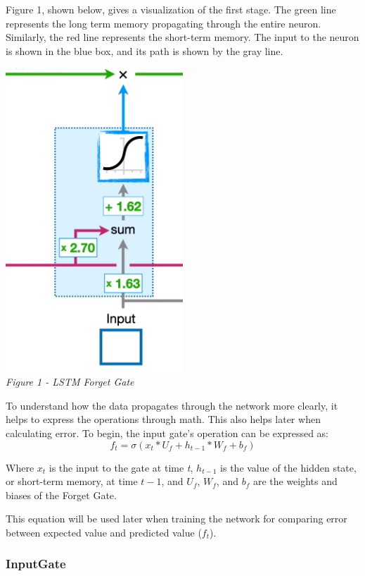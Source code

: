 \documentclass[12pt]{article}
\begin{document}
Figure 1, shown below, gives a visualization of the first stage. The green line
represents the long term memory propagating through the entire neuron.
Similarly, the red line represents the short-term memory. The input to the
neuron is shown in the blue box, and its path is shown by the gray line.

\begin{center}
    \includegraphics[width=0.5\textwidth]{ForgetGate.png}\\
    \emph{Figure 1 - LSTM Forget Gate}
\end{center}
To understand how the data propagates through the network more clearly, it
helps to express the operations through math. This also helps later when
calculating error. To begin, the input gate's operation can be expressed as:
\begin{equation}
    f_t = \sigma(x_t*U_f + h_{t-1}*W_f + b_f)
\end{equation}

Where $x_t$ is the input to the gate at time \emph{t}, $h_{t-1}$ is the value
of the hidden state, or short-term memory, at time $t - 1$, and $U_f$, $W_f$,
and $b_f$ are the weights and biases of the Forget Gate.

This equation will be used later when training the network for comparing error
between expected value and predicted value ($f_t$).

\subsubsection{InputGate}
\end{document}
